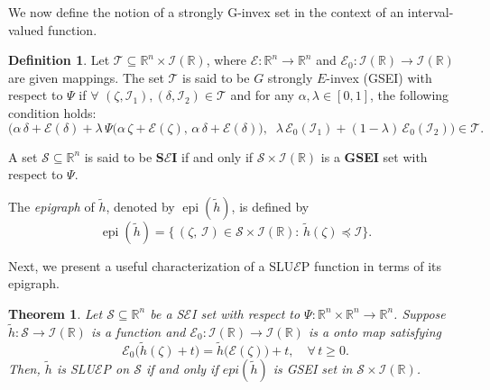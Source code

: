 \documentclass[12pt, reqno]{amsart}
\newtheorem{theorem}{Theorem}[section]
\theoremstyle{definition}
\newtheorem{definition}{Definition}[section]
\theoremstyle{remark}
\numberwithin{equation}{section}
\begin{document}
    We now define the notion of a strongly G-invex set in the context of an interval-valued function.
   \begin{definition}
    		\noindent
Let $\mathcal{T} \subseteq \mathbb{R}^{n} \times \mathcal{I}(\mathbb{R})$, where $\mathcal{E} : \mathbb{R}^{n} \to \mathbb{R}^{n}$ and $\mathcal{E}_{0} : \mathcal{I}(\mathbb{R}) \to \mathcal{I}(\mathbb{R})$ are given mappings. The set $\mathcal{T}$ is said to be $G$ strongly $E$-invex (GSEI) with respect to $\Psi$ if $\forall$ $(\zeta, \mathcal{I}_1), (\delta, \mathcal{I}_2) \in \mathcal{T}$ and for any $\alpha, \lambda \in [0,1]$, the following condition holds:
\[
\Big(
\alpha\, \delta + \mathcal{E}(\delta) + \lambda\, \Psi\big(\alpha\, \zeta + \mathcal{E}(\zeta),\, \alpha\, \delta + \mathcal{E}(\delta)\big),\;\;
\lambda\, \mathcal{E}_{0}(\mathcal{I}_1) + (1 - \lambda)\, \mathcal{E}_{0}(\mathcal{I}_2)
\Big)
\in \mathcal{T}.
\]
\end{definition}
\noindent
A set ${\mathcal{S}} \subseteq \mathbb{R}^{n}$ is said to be \textbf{S$\mathcal{E}$I} if and only if ${\mathcal{S}} \times \mathcal{I}(\mathbb{R})$ is a \textbf{GSEI} set with respect to ${\Psi}$.

\noindent
The \emph{epigraph} of $\tilde{h}$, denoted by $\operatorname{epi}(\tilde{h})$, is defined by
\[
\operatorname{epi}(\tilde{h}) = \big\{\, (\zeta,\, \mathcal{I}) \in {\mathcal{S}} \times \mathcal{I}(\mathbb{R}) :\, \tilde{h}(\zeta) \preceq \mathcal{I} \big\}.
\]

\noindent
Next, we present a useful characterization of a SLU$\mathcal{E}$P function in terms of its epigraph.

    	 
    	 \begin{theorem} \label{theorem 3.6 p4} 
    	 	\noindent
Let $\mathcal{S} \subseteq \mathbb{R}^{n}$ be a S$\mathcal{E}$I set with respect to $\Psi: \mathbb{R}^{n} \times \mathbb{R}^{n} \to \mathbb{R}^{n}$. Suppose $\tilde{h}: \mathcal{S} \to \mathcal{I}(\mathbb{R})$ is a function and $\mathcal{E}_{0}: \mathcal{I}(\mathbb{R}) \to \mathcal{I}(\mathbb{R})$ is a onto map satisfying
\[
\mathcal{E}_{0}\big( \tilde{h}(\zeta) + t \big) = \tilde{h}\big( \mathcal{E}(\zeta) \big) + t,\quad \forall\, t \geq 0.
\]
Then, $\tilde{h}$ is SLU$\mathcal{E}$P on $\mathcal{S}$ if and only if  $epi(\tilde{h})$ is GSEI set in $\mathcal{S} \times \mathcal{I}(\mathbb{R})$.

    	 \end{theorem} 
    	   
\end{document}
